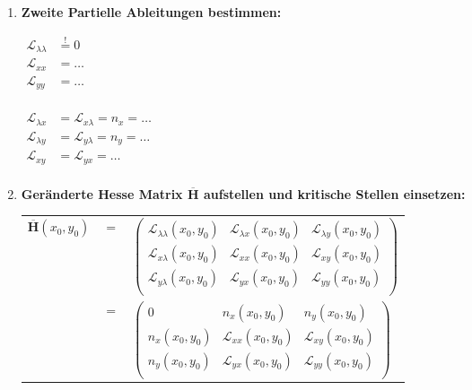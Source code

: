 \begin{enumerate}[itemsep=1ex]
    \item \textbf{Zweite Partielle Ableitungen bestimmen:}\\
    \begin{minipage}[t]{0.4\columnwidth}
        $\begin{aligned}
            \mathcal{L}_{\lambda \lambda} &\stackrel{!}{=} 0\\
            \mathcal{L}_{xx} &= \dots\\
            \mathcal{L}_{yy} &= \dots\\
        \end{aligned}$
    \end{minipage}\hfill
    \begin{minipage}[c]{0.6\columnwidth}
        $\begin{aligned}
            \mathcal{L}_{\lambda x} &= \mathcal{L}_{x\lambda} = n_x = \dots\\
            \mathcal{L}_{\lambda y} &= \mathcal{L}_{y\lambda} = n_y =\dots\\
            \mathcal{L}_{xy} &= \mathcal{L}_{yx} = \dots\\
        \end{aligned}$
    \end{minipage}


    \item \textbf{Geränderte Hesse Matrix $\overline{\mathbf{H}}$ aufstellen und kritische Stellen einsetzen:}\\
    
    \begin{tabular}{lll}
        $\overline{\mathbf{H}}(x_0,y_0)$ &$=$&
        $\left(
            \begin{matrix}
                {{\mathcal{L}_{\lambda\lambda}(x_0, y_0)}}&{{\mathcal{L}_{\lambda x}(x_0, y_0)}}&{{\mathcal{L}_{\lambda y}(x_0, y_0)}}\\
                {{\mathcal{L}_{x\lambda}(x_0, y_0)}}&{{\mathcal{L}_{xx}(x_0, y_0)}}&{{\mathcal{L}_{xy}(x_0, y_0)}}\\
                {{\mathcal{L}_{y\lambda}(x_0, y_0)}}&{{\mathcal{L}_{yx}(x_0, y_0)}}&{{\mathcal{L}_{yy}(x_0, y_0)}}\\
            \end{matrix}
        \right)$\\
        &$=$&
        $\left(
            \begin{matrix}
                {{0}}&{{n_{x}(x_0, y_0)}}&{{n_{y}(x_0, y_0)}}\\
                {{n_{x}(x_0, y_0)}}&{{\mathcal{L}_{xx}(x_0, y_0)}}&{{\mathcal{L}_{xy}(x_0, y_0)}}\\
                {{n_{y}(x_0, y_0)}}&{{\mathcal{L}_{yx}(x_0, y_0)}}&{{\mathcal{L}_{yy}(x_0, y_0)}}\\
            \end{matrix}
        \right)$
        

\end{tabular}
\end{enumerate}
